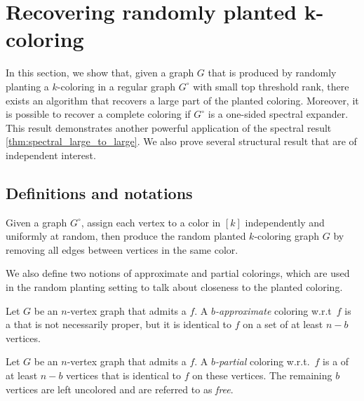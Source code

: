 \section{Recovering randomly planted k-coloring}

In this section, we show that, given a graph $G$ that is produced by randomly planting a $k$-coloring in a regular graph $G^{\circ}$ with small top threshold rank, there exists an algorithm that recovers a large part of the planted coloring. Moreover, it is possible to recover a complete coloring if $G^{\circ}$ is a one-sided spectral expander. This result demonstrates another powerful application of the spectral result \cref{thm:spectral_large_to_large}. We also prove several structural result that are of independent interest.

\subsection{Definitions and notations}

\begin{definition}
\label{def:random_planting_model}
    Given a graph $G^{\circ}$, assign each vertex to a color in $[k]$ independently and uniformly at random, then produce the random planted $k$-coloring graph $G$ by removing all edges between vertices in the same color.
\end{definition}

We also define two notions of approximate and partial colorings, which are used in the random planting setting to talk about closeness to the planted coloring.

\begin{definition}
    \label{def: approximatedcoloring}
    Let $G$ be an $n$-vertex graph that admits a \kcl $f$.
    A {\em $b$-approximate} coloring w.r.t\ $f$ is a \kcl
    that is not necessarily proper, but it is identical to $f$ on a set of at least $n-b$ vertices.
\end{definition}

\begin{definition}
    \label{def: partialcoloring}
    Let $G$ be an $n$-vertex graph that admits a \kcl $f$.
    A {\em $b$-partial} coloring w.r.t.\ $f$ is a \kcl of at least $n-b$ vertices that is identical to $f$ on these vertices.
    The remaining $b$ vertices are left uncolored and are referred to as {\em free}.
\end{definition}

